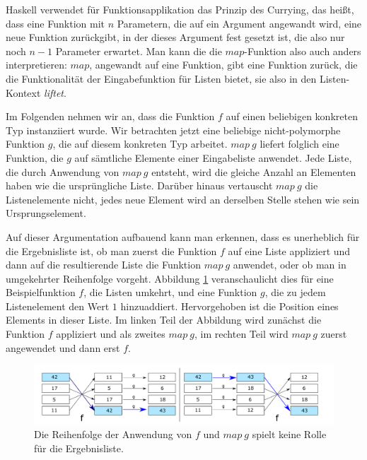 Haskell verwendet für Funktionsapplikation das Prinzip des Currying, das heißt, dass eine Funktion mit $n$ Parametern, die auf ein
Argument angewandt wird, eine neue Funktion zurückgibt, in der dieses Argument fest gesetzt ist, die also nur noch $n-1$ Parameter erwartet. 
Man kann die die $map$-Funktion also auch anders interpretieren: $map$, angewandt auf eine Funktion, gibt eine Funktion zurück, die
die Funktionalität der Eingabefunktion für Listen bietet, sie also in den Listen-Kontext \textit{liftet}.

Im Folgenden nehmen wir an, dass die Funktion $f$ auf einen beliebigen konkreten Typ instanziiert wurde.
Wir betrachten jetzt eine beliebige nicht-polymorphe Funktion $g$, die auf diesem konkreten Typ arbeitet. $map\ g$ liefert folglich eine Funktion,
die $g$ auf sämtliche Elemente einer Eingabeliste
anwendet. Jede Liste, die durch Anwendung von $map\ g$ entsteht, wird die gleiche Anzahl an Elementen haben wie die ursprüngliche Liste.
Darüber hinaus vertauscht $map\ g$ die Listenelemente nicht, jedes neue Element wird an derselben Stelle stehen wie
sein Ursprungselement.

Auf dieser Argumentation aufbauend kann man erkennen, dass es unerheblich für die Ergebnisliste ist, ob man zuerst die
Funktion $f$ auf eine Liste appliziert und dann auf die resultierende Liste die Funktion $map\ g$ anwendet, oder ob man
in umgekehrter Reihenfolge vorgeht. Abbildung \ref{fig:fmapg} veranschaulicht dies für eine Beispielfunktion $f$, die Listen
umkehrt, und eine Funktion $g$, die zu jedem Listenelement den Wert $1$ hinzuaddiert. Hervorgehoben ist die Position
eines Elements in dieser Liste. Im linken Teil der Abbildung wird zunächst die Funktion $f$ appliziert und als zweites
$map\ g$, im rechten Teil wird $map\ g$ zuerst angewendet und dann erst $f$.

\begin{figure}[ht]
\centering
\includegraphics[width=430px]{fmapg}
\caption{Die Reihenfolge der Anwendung von $f$ und $map\ g$ spielt keine Rolle für die Ergebnisliste.}
\label{fig:fmapg}
\end{figure}

